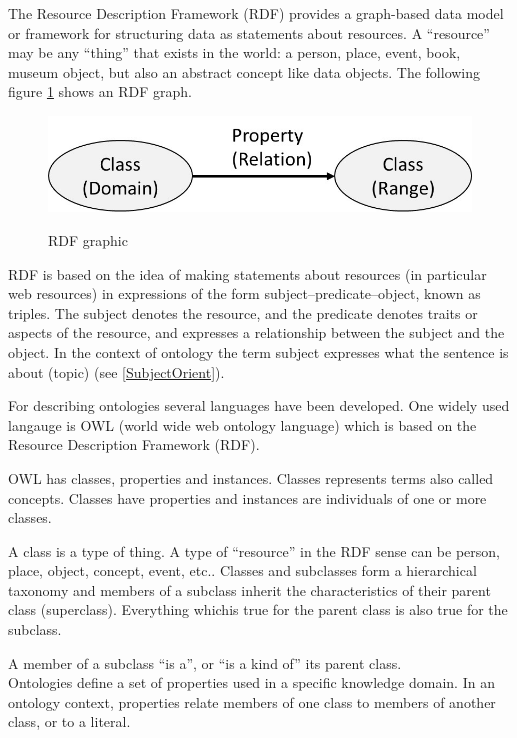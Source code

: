 The Resource Description Framework (RDF) provides a graph-based data model or framework for structuring data as statements about resources. A “resource” may be any “thing” that exists in the world: a person, place, event, book, museum object, but also an abstract concept like data objects.
The following figure \ref{fig:classes-properties}  shows an RDF graph.

\strictpagecheck
\begin{figure}[h]
	\centering
	\includegraphics[width=0.6\linewidth]{20181026-Ontologie-Bilder/Grafiken-Ontologie/Introduction/Classes-Properties}
	\begin{sidecaption}
		{RDF graphic}
	\end{sidecaption}
	\label{fig:classes-properties}
\end{figure}

RDF is based on the idea of making statements about resources (in particular web resources) in expressions of the form subject–predicate–object, known as triples. The subject denotes the resource, and the predicate denotes traits or aspects of the resource, and expresses a relationship between the subject and the object. In the context of ontology the term subject expresses what the sentence is about (topic) (see \ref{SubjectOrient}).

For describing ontologies several languages have been developed. One widely used langauge is OWL (world wide web ontology language) which is based on the Resource Description Framework (RDF).

OWL has classes, properties and instances. Classes represents terms also called concepts. Classes have properties and instances are individuals of one or more classes.

A class is a type of thing. A type of “resource” in the RDF sense can be
person, place, object, concept, event, etc.. Classes and subclasses form a hierarchical taxonomy and members of a subclass inherit the characteristics of their parent class (superclass). Everything whichis true for the parent class is also true for the subclass.

A member of a subclass “is a”, or “is a kind of” its parent class.\\
Ontologies define a set of properties used in a specific knowledge domain. In an ontology context, properties relate members of one class to members of another class, or to a literal.

